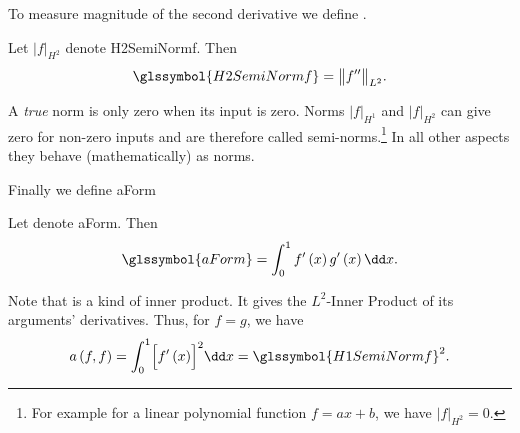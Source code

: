 To measure magnitude of the second derivative we define .
\begin{definition}	\label{def:H2_Semi_Norm}
	Let $\vert f \vert_{ H^2 }$ denote \gls{H2SemiNormf}. Then
	\begin{equation}	\label{eqn:H2_Semi_Norm}
		\glssymbol{H2SemiNormf} = \big\| f^{ \prime \prime }\big\|_{ L^2 } .
	\end{equation}
\end{definition}
\begin{remark}
	A \emph{true} norm is only zero when its input is zero. Norms $\vert f \vert_{ H^1 }$ and $\vert f \vert_{ H^2 }$ can give zero
	for non-zero inputs and are therefore called semi-norms.\footnote{For example for a linear polynomial function $f = ax + b$, we
	have $\vert f \vert_{ H^2 } = 0$.} In all other aspects they behave (mathematically) as norms.
\end{remark}
Finally we define \gls{aForm}
\begin{definition}	\label{def:a_Form}
	Let  denote \gls{aForm}. Then
	\begin{equation}	\label{eqn:a_Norm}
		\glssymbol{aForm} = \int_0^1 f^{\prime} \left(x \right) g^{\prime} \left(x \right) \dd x.
	\end{equation}
\end{definition}
\begin{remark}
	Note that  is a kind of inner product. It gives the $L^2$-Inner Product of its arguments' derivatives.
	Thus, for $f = g$, we have
	\begin{equation}
		a \left( f, f \right) = \int_0^1 \Bigl[ f^{\prime} \left(x \right) \Bigr]^2 \dd x = \glssymbol{H1SemiNormf}^2.
	\end{equation}
\end{remark}
%